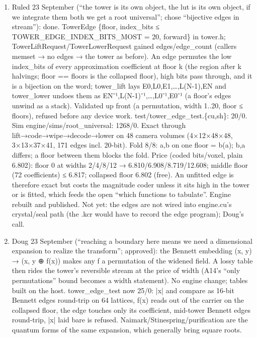 \begin{enumerate}
\item Ruled 23 September (“the tower is its own object, the lut is its own object, if we integrate them both we get a root universal”; chose “bijective edges in stream”): done. TowerEdge \{floor, index\_\allowbreak{}bits ≤ TOWER\_\allowbreak{}EDGE\_\allowbreak{}INDEX\_\allowbreak{}BITS\_\allowbreak{}MOST = 20, forward\} in tower.h; TowerLiftRequest/TowerLowerRequest gained edges/edge\_\allowbreak{}count (callers memset → no edges → the tower as before). An edge permutes the low index\_\allowbreak{}bits of every approximation coefficient at floor k (the region after k halvings; floor == floors is the collapsed floor), high bits pass through, and it is a bijection on the word; tower\_\allowbreak{}lift lays E0,L0,E1,…,L(N-1),EN and tower\_\allowbreak{}lower undoes them as EN⁻¹,L(N-1)⁻¹,…,L0⁻¹,E0⁻¹ (a floor's edges unwind as a stack). Validated up front (a permutation, width 1..20, floor ≤ floors), refused before any device work. test/tower\_\allowbreak{}edge\_\allowbreak{}test.\{cu,sh\}: 20/0. Sim engine/sims/root\_\allowbreak{}universal: 1268/0. Exact through lift→code→wipe→decode→lower on 48 camera volumes (4×12×48×48, 3×13×37×41, 171 edges incl. 20-bit). Fold 8/8: a,b on one floor = b(a); b,a differs; a floor between them blocks the fold. Price (coded bits/voxel, plain 6.802): floor 0 at widths 2/4/8/12 → 6.810/6.908/8.719/12.608; middle floor (72 coefficients) ≤ 6.817; collapsed floor 6.802 (free). An unfitted edge is therefore exact but costs the magnitude coder unless it sits high in the tower or is fitted, which feeds the open “which functions to tabulate”. Engine rebuilt and published. Not yet: the edges are not wired into engine.cu's crystal/seal path (the .kcr would have to record the edge program); Doug's call.
\item Doug 23 September (“reaching a boundary here means we need a dimensional expansion to realize the transform”; approved): the Bennett embedding (x, y) → (x, y ⊕ f(x)) makes any f a permutation of the widened field. A lossy table then rides the tower's reversible stream at the price of width (A14's “only permutations” bound becomes a width statement). No engine change; tables built on the host. tower\_\allowbreak{}edge\_\allowbreak{}test now 25/0: |x| and compare as 16-bit Bennett edges round-trip on 64 lattices, f(x) reads out of the carrier on the collapsed floor, the edge touches only its coefficient, mid-tower Bennett edges round-trip, |x| laid bare is refused. Naimark/Stinespring/purification are the quantum forms of the same expansion, which generally bring square roots.

\end{enumerate}
